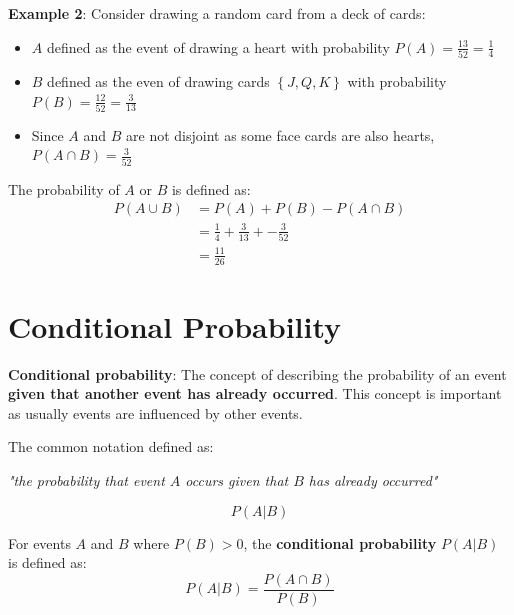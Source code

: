 \documentclass[10pt,a4paper]{article}
\begin{document}
\textbf{Example 2}: Consider drawing a random card from a deck of cards:
\begin{itemize}
    \item $A$ defined as the event of drawing a heart with probability $P(A)=\frac{13}{52}=\frac{1}{4}$
    \item $B$ defined as the even of drawing cards $\left\{J, Q, K\right\}$ with probability $P(B)=\frac{12}{52}=\frac{3}{13}$
    \item Since $A$ and $B$ are not disjoint as some face cards are also hearts, $P(A\cap B)=\frac{3}{52}$
\end{itemize}

The probability of $A$ or $B$ is defined as:
\begin{align*}
    P(A \cup B) &= P(A) + P(B) - P(A\cap B) \\
    &= \frac{1}{4} + \frac{3}{13} + - \frac{3}{52} \\
    &= \frac{11}{26} 
\end{align*}

\section{Conditional Probability}

\textbf{Conditional probability}: The concept of describing the probability of an event \textbf{given that
another event has already occurred}. This concept is important as usually events are influenced by other events.

The common notation defined as:
\begin{center}
    \textit{"the probability that event $A$ occurs given that $B$ has already occurred"}
\end{center} 
$$
    P(A|B)
$$

\begin{tcolorbox}[breakable,colback=white]
For events $A$ and $B$ where $P(B)>0$, the \textbf{conditional probability} $P(A|B)$ is defined as:
$$
    P(A|B) = \frac{P(A\cap B)}{P(B)}
$$
\end{tcolorbox}
\end{document}
